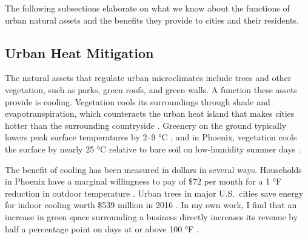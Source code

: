 \documentclass[12pt]{article}
\begin{document}

The following subsections elaborate on what we know about the functions of urban natural assets and the benefits they provide to cities and their residents.

\subsection{Urban Heat Mitigation}\label{sec:heat}

The natural assets that regulate urban microclimates include trees and other vegetation, such as parks, green roofs, and green walls. A function these assets provide is cooling. Vegetation cools its surroundings through shade and evapotranspiration, which counteracts the urban heat island that makes cities hotter than the surrounding countryside \citep{mohajeraniUrbanHeatIsland2017, wongGreeneryMitigationAdaptation2021}. Greenery on the ground typically lowers peak surface temperatures by 2--9 °C \citep{wongGreeneryMitigationAdaptation2021}, and in Phoenix, vegetation cools the surface by nearly 25 °C relative to bare soil on low-humidity summer days \citep{jenerette_ecosystem_2011}. 

The benefit of cooling has been measured in dollars in several ways. Households in Phoenix have a marginal willingness to pay of \$72 per month for a 1 °F reduction in outdoor temperature \citep{klaiberItLessHot2017}. Urban trees in major U.S.\ cities save energy for indoor cooling worth \$539 million in 2016 \citep{herisPilotingUrbanEcosystem2021}. In my own work, I find that an increase in green space surrounding a business directly increases its revenue by half a percentage point on days at or above 100 °F \citep{creelValueNatureBasedAdaptation2026}.
\end{document}
